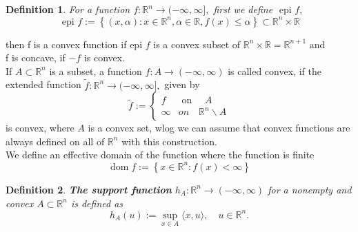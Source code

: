\documentclass[oneside]{book}
\newtheorem{mydef}{Definition}[section]
\begin{document}
	
	\begin{mydef} \label{d:9}
		For a function   $f: \mathbb{R}^{n} \rightarrow(-\infty, \infty],$ first we define $\text { epi } f, $  
		\begin{equation}
			\label{eq40}
			\text { epi } f:=\left\{(x, \alpha): x \in \mathbb{R}^{n}, \alpha \in \mathbb{R}, f(x) \leq \alpha\right\} \subset \mathbb{R}^{n} \times \mathbb{R} 
		\end{equation}
	\end{mydef}
	
	then f is a convex function if epi $f$ is a convex subset of $\mathbb{R}^{n} \times \mathbb{R}=\mathbb{R}^{n+1}$  and \\  f is concave, if $-f$ is convex. 
	\\
	
	If $A \subset \mathbb{R}^{n}$ is a subset, a function $f: A \rightarrow(-\infty, \infty)$ is called convex, if the extended function $\tilde{f}: \mathbb{R}^{n} \rightarrow(-\infty, \infty],$ given by
	$$
	\tilde{f}:=\left\{\begin{array}{ll}
	f & \text { on } \quad A \\
	\infty & {  on } \quad \mathbb{R}^{n} \backslash A
	\end{array}\right.
	$$
	is convex,  where  $A$ is a convex set, wlog we can assume that convex functions are always defined on all of $\mathbb{R}^{n}$ with this construction.
	\\
	
	We define an effective domain of the function where the function is finite
	$$
	\operatorname{dom} f:=\left\{x \in \mathbb{R}^{n}: f(x)<\infty\right\}
	$$
	
	
	
	\begin{mydef} \label{d:10}
		\textbf{The support function }$h_{A}: \mathbb{R}^{n} \rightarrow(-\infty, \infty) $  for a nonempty and convex $A \subset \mathbb{R}^{n}$ is defined as
		$$
		h_{A}(u):=\sup _{x \in A}\langle x, u\rangle, \quad u \in \mathbb{R}^{n}.
		$$
		
	\end{mydef}
	
	
	
\end{document}
